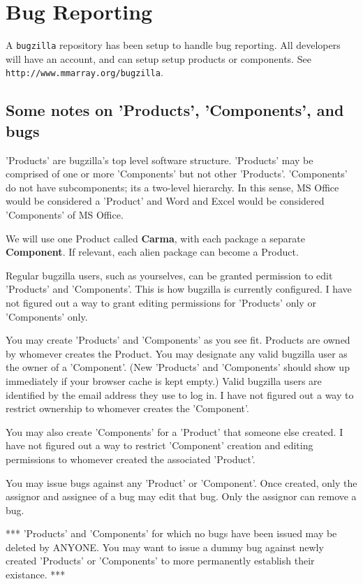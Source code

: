 \documentclass{article}
\begin{document}
\section{Bug Reporting}

A {\tt bugzilla} repository has been setup to handle bug reporting. All developers
will have an account, and can setup setup products or components. See
{\tt http://www.mmarray.org/bugzilla}.

\subsection{Some notes on 'Products', 'Components', and bugs}

'Products' are bugzilla's top level software structure.  'Products' may
be comprised of one or more 'Components' but not other 'Products'.
'Components' do not have subcomponents; its a two-level hierarchy.  In
this sense, MS Office would be considered a 'Product' and Word and Excel
would be considered 'Components' of MS Office.

We will use one Product called {\bf Carma}, with each package a separate
{\bf Component}. If relevant, each alien package can become a 
Product.

Regular bugzilla users, such as yourselves, can be granted permission 
to edit 'Products' and 'Components'.  This is how bugzilla is currently
configured.  I have not figured out a way to grant editing permissions
for 'Products' only or 'Components' only. 

You may create 'Products' and 'Components' as you see fit.  Products are
owned by whomever creates the Product.  You may designate any valid 
bugzilla user as the owner of a 'Component'.  (New 'Products' and 
'Components' should show up immediately if your browser cache is kept 
empty.)  Valid bugzilla users are identified by the email address they 
use to log in.  I have not figured out a way to restrict ownership to 
whomever creates the 'Component'.

You may also create 'Components' for a 'Product' that someone else
created.  I have not figured out a way to restrict 'Component' creation
and editing permissions to whomever created the associated 'Product'.

You may issue bugs against any 'Product' or 'Component'.  Once
created, only the assignor and assignee of a bug may edit that bug.
Only the assignor can remove a bug.

*** 'Products' and 'Components' for which no bugs have been issued
may be deleted by ANYONE. You may want to issue a dummy bug against
newly created 'Products' or 'Components' to more permanently establish
their existance. ***
\end{document}
